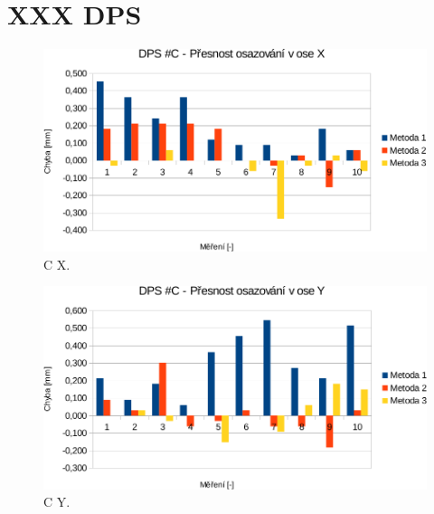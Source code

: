 \section{XXX DPS}

\begin{figure}[H]
  \centering
    \includegraphics[width=0.9\linewidth]{pdf/C_X-crop2.pdf}%
    \caption{C X.}
    \label{graf:CX}
\end{figure}
\begin{figure}[H]
  \centering
    \includegraphics[width=0.9\linewidth]{pdf/C_Y-crop2.pdf}%
    \caption{C Y.}
    \label{graf:CY}
\end{figure}


